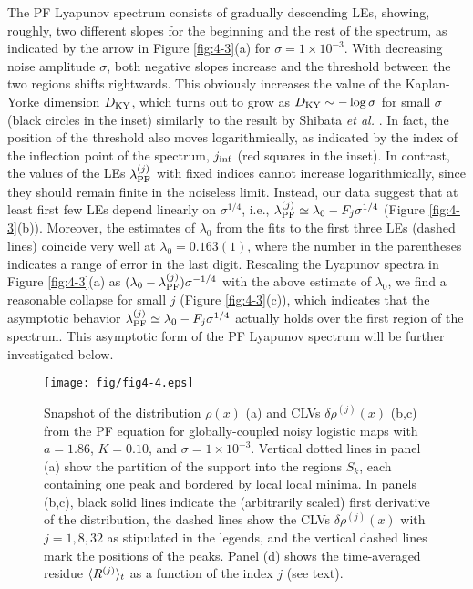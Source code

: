 \documentclass[12pt]{iopart}
\begin{document}
The PF Lyapunov spectrum consists of gradually descending LEs,
 showing, roughly, two different slopes for the beginning and the rest
 of the spectrum, as indicated by the arrow in Figure \ref{fig:4-3}(a)
 for $\sigma = 1 \times 10^{-3}$.
With decreasing noise amplitude $\sigma$,
 both negative slopes increase
 and the threshold between the two regions shifts rightwards.
This obviously increases the value of the Kaplan-Yorke dimension $D_{\rm KY}$,
 which turns out to grow as $D_{\rm KY} \sim -\log\sigma$ for small $\sigma$
 (black circles in the inset)
 similarly to the result by Shibata \textit{et al.}
 \cite{Shibata.etal-PRL1999}.
In fact, the position of the threshold also moves logarithmically,
 as indicated by the index of the inflection point of the spectrum,
 $j_{\rm inf}$ (red squares in the inset).
In contrast, the values of the LEs $\lambda_{\rm PF}^{(j)}$
 with fixed indices cannot increase logarithmically,
 since they should remain finite in the noiseless limit.
Instead, our data suggest that at least first few LEs
 depend linearly on $\sigma^{1/4}$,
 i.e., $\lambda_{\rm PF}^{(j)} \simeq \lambda_0 - F_j \sigma^{1/4}$
 (Figure \ref{fig:4-3}(b)).
Moreover, the estimates of $\lambda_0$ from the fits to the first three LEs
 (dashed lines)
 coincide very well at $\lambda_0 = 0.163(1)$,
 where the number in the parentheses
 indicates a range of error in the last digit.
Rescaling the Lyapunov spectra in Figure \ref{fig:4-3}(a)
 as $(\lambda_0 - \lambda_{\rm PF}^{(j)}) \sigma^{-1/4}$
 with the above estimate of $\lambda_0$,
 we find a reasonable collapse for small $j$ (Figure \ref{fig:4-3}(c)),
 which indicates that the asymptotic behavior
 $\lambda_{\rm PF}^{(j)} \simeq \lambda_0 - F_j \sigma^{1/4}$
 actually holds over the first region of the spectrum.
This asymptotic form of the PF Lyapunov spectrum will be
 further investigated below.

\begin{figure}[t]
 \begin{center}
  \texttt{[image: fig/fig4-4.eps]}
  \caption{Snapshot of the distribution $\rho(x)$ (a) and CLVs $\delta\rho^{(j)}(x)$ (b,c) from the PF equation for globally-coupled noisy logistic maps  with $a=1.86$, $K=0.10$, and $\sigma = 1 \times 10^{-3}$. Vertical dotted lines in panel (a) show the partition of the support into the regions $S_k$, each containing one peak and bordered by local local minima. In panels (b,c), black solid lines indicate the (arbitrarily scaled) first derivative of the distribution, the dashed lines show the CLVs $\delta\rho^{(j)}(x)$ with $j=1, 8, 32$ as stipulated in the legends, and the vertical dashed lines mark the positions of the peaks. Panel (d) shows the time-averaged residue $\langle R^{(j)} \rangle_t$ as a function of the index $j$ (see text).}
  \label{fig:4-4}
 \end{center}
\end{figure}%
\end{document}
